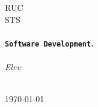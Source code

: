 \begin{titlepage}
  \begin{center}

    \textsc{\LARGE RUC}\\[1.5cm]
    \textsc{\Large STS}\\[0.5cm]

    \HRule\\[0.4cm]
	  {\huge \bfseries \texttt{Software Development}.\\[0.4cm]}
    \HRule\\[1.5cm]

    \emph{Elev}\\[0.1cm]
    \noindent{}\\[1cm]

    \vfill

    {\large \today}

  \end{center}
\end{titlepage}
